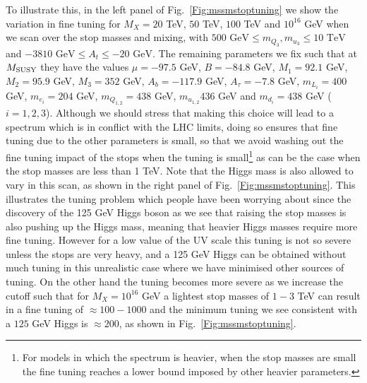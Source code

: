 \documentclass[preprint,amsmath,amssymb,aps,superscriptaddress,prd,showpacs,floatfix,nofootinbib]{revtex4-1}
\begin{document}
To illustrate this, in the left panel of Fig.~\ref{Fig:mssmstoptuning}
we show the variation in fine tuning for $M_X=20$ TeV, $50$ TeV, $100$
TeV and $10^{16}$ GeV when we scan over the stop masses and mixing,
with $500 \textrm{ GeV} \leq m_{Q_3},m_{u_3}\leq 10\textrm{ TeV}$ and
$-3810\textrm{ GeV}\leq A_t\leq -20\textrm{ GeV}$.  The remaining
parameters we fix such that at $M_{\rm SUSY}$ they have the values
$\mu=-97.5$ GeV, $B=-84.8$ GeV, $M_1=92.1$ GeV, $M_2=95.9$ GeV,
$M_3=352$ GeV, $A_b=-117.9$ GeV, $A_\tau=-7.8$ GeV, $m_{L_i}=400$ GeV,
$m_{e_i}=204$ GeV, $m_{Q_{1,2}}=438$ GeV, $m_{u_{1,2}}436$ GeV and
$m_{d_i}=438$ GeV ($i=1,2,3$). Although we should stress that making
this choice will lead to a spectrum which is in conflict with the LHC
limits, doing so ensures that fine tuning due to the other parameters
is small, so that we avoid washing out the fine tuning impact of the
stops when the tuning is small\footnote{For models in which the
  spectrum is heavier, when the stop masses are small the fine tuning
  reaches a lower bound imposed by other heavier parameters.} as can
be the case when the stop masses are less than 1 TeV.  Note that the
Higgs mass is also allowed to vary in this scan, as shown in the right
panel of Fig.~\ref{Fig:mssmstoptuning}. This illustrates the tuning
problem which people have been worrying about since the discovery of
the 125 GeV Higgs boson as we see that raising the stop masses is also
pushing up the Higgs mass, meaning that heavier Higgs masses require
more fine tuning.  However for a low value of the UV scale this tuning
is not so severe unless the stops are very heavy, and a 125 GeV Higgs
can be obtained without much tuning in this unrealistic case where we
have minimised other sources of tuning.  On the other hand the tuning
becomes more severe as we increase the cutoff such that for $M_X =
10^{16}$ GeV a lightest stop masses of $1-3$ TeV can result in a fine
tuning of $\approx 100 - 1000$ and the minimum tuning we see
consistent with a $125$ GeV Higgs is $\approx 200$, as shown in
Fig.~\ref{Fig:mssmstoptuning}.

\end{document}
